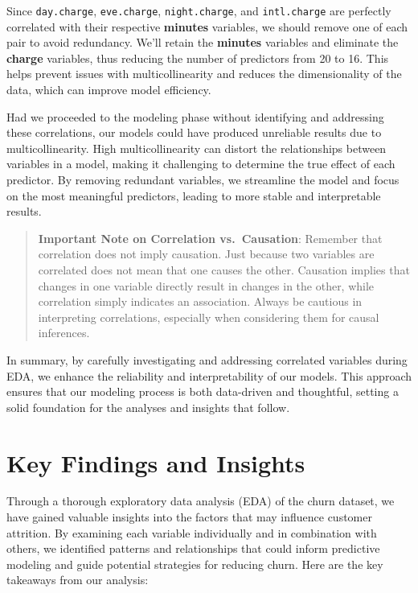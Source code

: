 \documentclass[
]{book}
\newcommand{\passthrough}[1]{#1}
\theoremstyle{definition}
\theoremstyle{definition}
\theoremstyle{definition}
\theoremstyle{definition}
\theoremstyle{remark}
\begin{document}
Since \passthrough{\lstinline!day.charge!}, \passthrough{\lstinline!eve.charge!}, \passthrough{\lstinline!night.charge!}, and \passthrough{\lstinline!intl.charge!} are perfectly correlated with their respective \textbf{minutes} variables, we should remove one of each pair to avoid redundancy. We'll retain the \textbf{minutes} variables and eliminate the \textbf{charge} variables, thus reducing the number of predictors from 20 to 16. This helps prevent issues with multicollinearity and reduces the dimensionality of the data, which can improve model efficiency.

Had we proceeded to the modeling phase without identifying and addressing these correlations, our models could have produced unreliable results due to multicollinearity. High multicollinearity can distort the relationships between variables in a model, making it challenging to determine the true effect of each predictor. By removing redundant variables, we streamline the model and focus on the most meaningful predictors, leading to more stable and interpretable results.

\begin{quote}
\textbf{Important Note on Correlation vs.~Causation}: Remember that correlation does not imply causation. Just because two variables are correlated does not mean that one causes the other. Causation implies that changes in one variable directly result in changes in the other, while correlation simply indicates an association. Always be cautious in interpreting correlations, especially when considering them for causal inferences.
\end{quote}

In summary, by carefully investigating and addressing correlated variables during EDA, we enhance the reliability and interpretability of our models. This approach ensures that our modeling process is both data-driven and thoughtful, setting a solid foundation for the analyses and insights that follow.

\section{Key Findings and Insights}\label{key-findings-and-insights}

Through a thorough exploratory data analysis (EDA) of the churn dataset, we have gained valuable insights into the factors that may influence customer attrition. By examining each variable individually and in combination with others, we identified patterns and relationships that could inform predictive modeling and guide potential strategies for reducing churn. Here are the key takeaways from our analysis:
\end{document}
